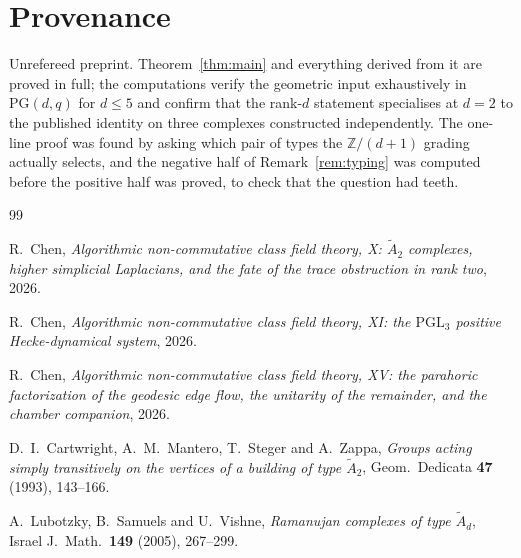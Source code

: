 \documentclass[11pt]{amsart}
\numberwithin{equation}{section}
\theoremstyle{definition}
\theoremstyle{remark}
\newcommand{\Z}{\mathbb{Z}}
\newcommand{\PG}{\mathrm{PG}}
\begin{document}
\section*{Provenance}

Unrefereed preprint. Theorem~\ref{thm:main} and everything derived from it are proved in
full; the computations verify the geometric input exhaustively in $\PG(d,q)$ for $d\le5$
and confirm that the rank-$d$ statement specialises at $d=2$ to the published identity on
three complexes constructed independently. The one-line proof was found by asking which
pair of types the $\Z/(d+1)$ grading actually selects, and the negative half of
Remark~\ref{rem:typing} was computed before the positive half was proved, to check that
the question had teeth.

\begin{thebibliography}{99}

 R.~Chen, \emph{Algorithmic non-commutative class field theory, X:
$\widetilde A_2$ complexes, higher simplicial Laplacians, and the fate of the trace
obstruction in rank two}, 2026.

 R.~Chen, \emph{Algorithmic non-commutative class field theory, XI: the
$\mathrm{PGL}_3$ positive Hecke-dynamical system}, 2026.

 R.~Chen, \emph{Algorithmic non-commutative class field theory, XV: the
parahoric factorization of the geodesic edge flow, the unitarity of the remainder, and the
chamber companion}, 2026.

 D.~I.~Cartwright, A.~M.~Mantero, T.~Steger and A.~Zappa,
\emph{Groups acting simply transitively on the vertices of a building of type
$\widetilde A_2$}, Geom.\ Dedicata \textbf{47} (1993), 143--166.

 A.~Lubotzky, B.~Samuels and U.~Vishne,
\emph{Ramanujan complexes of type $\widetilde A_d$},
Israel J.\ Math.\ \textbf{149} (2005), 267--299.

\end{thebibliography}
\end{document}

